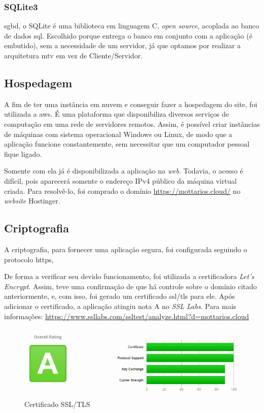 \subsubsection{SQLite3}
\ac{sgbd}, o SQLite é uma biblioteca em linguagem C, \textit{\gls{open source}}, acoplada ao banco de dados \ac{sql}. Escolhido porque entrega o banco em conjunto com a aplicação (é embutido), sem a necessidade de um servidor, já que optamos por realizar a arquitetura \ac{mtv} em vez de Cliente/Servidor.
\cite{silva_2007} \cite{carlos_2019}

 \subsection{Hospedagem}
 A fim de ter uma instância em nuvem e conseguir fazer a hospedagem do site, foi utilizada a \ac{aws}. É uma plataforma que disponibiliza diversos serviços de computação em uma rede de servidores remotos. Assim, é possível criar instâncias de máquinas com sistema operacional Windows ou Linux, de modo que a aplicação funcione constantemente, sem necessitar que um computador pessoal fique ligado. 

 Somente com ela já é disponibilizada a aplicação na \textit{web}. Todavia, o acesso é difícil, pois aparecerá somente o endereço IPv4 público da máquina virtual criada. Para resolvê-lo, foi comprado o domínio \url{https://mottarios.cloud/} no \textit{website} Hostinger.

 \subsection{Criptografia}
A criptografia, para fornecer uma aplicação segura, foi configurada seguindo o protocolo \ac{https}, 

De forma a verificar seu devido funcionamento, foi utilizada a certificadora \textit{Let’s Encrypt}. Assim, teve uma confirmação de que há controle sobre o domínio citado anteriormente, e, com isso, foi gerado um certificado \ac{ssl}/\ac{tls} para ele. Após adicionar o certificado, a aplicação atingiu nota A no \textit{SSL Labs}. Para mais informações: \url{https://www.ssllabs.com/ssltest/analyze.html?d=mottarios.cloud}
\
\begin{figure}[h]
    \centering
    \includegraphics[width=1.00\textwidth]{anexos/DiagramaDeArquitetura/Certificado_NotaA.jpeg}
    \caption{Certificado SSL/TLS}
    \label{fig:figura1} 
\end{figure}


